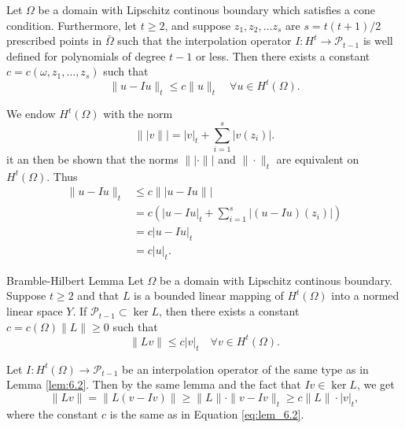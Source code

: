 
\begin{lem}{\quad}
Let $\Omega$ be a domain with Lipschitz continous boundary which satisfies a cone condition. Furthermore, let $t\geq 2$, and suppose $z_1,z_2,\ldots z_s$ are
$s = t(t+1)/2$ prescribed points in $\bar{\Omega}$ such that the interpolation operator $I:H^t \rightarrow \mathcal{P}_{t-1}$ is well defined
for polynomials of degree $t-1$ or less. Then there exists a constant $c=c(\omega,z_1,\ldots,z_s)$ such that
\begin{equation}
    \|u-Iu\|_t\leq c\|u\|_t\quad \forall u\in H^t(\Omega).
    \label{eq:lem_6.2}
\end{equation}
\label{lem:6.2}
\end{lem}

\begin{bev}
    We endow $H^t(\Omega)$ with the norm 
    \begin{equation*}
        \||v\|| = |v|_t + \sum_{i=1}^s |v(z_i)|.
    \end{equation*}
it an then be shown that the norms $\||\cdot\||$ and $\|\cdot\|_t$ are equivalent on $H^t(\Omega)$. Thus
\begin{align*}
    \|u-Iu\|_t&\leq c\||u-Iu\||\\
    &= c(|u-Iu|_t + \sum_{i=1}^s|(u-Iu)(z_i)|)\\
    &= c|u-Iu|_t \\
    &= c|u|_t.
\end{align*}

\end{bev}

\begin{lem}{Bramble-Hilbert Lemma}
    Let $\Omega$ be a domain with Lipschitz continous boundary. Suppose $t\geq 2$ and that $L$ is a bounded linear mapping of $H^t(\Omega)$ into a normed linear space $Y$.
    If $\mathcal{P}_{t-1}\subset \ker L$, then there exists a constant $c=c(\Omega)\|L\|\geq 0$ such that
    \begin{equation}
        \|Lv\|\leq c|v|_t\quad \forall v\in H^t(\Omega).
    \end{equation}
\end{lem}
\begin{bev}
    Let $I:H^t(\Omega)\rightarrow \mathcal{P}_{t-1}$ be an interpolation operator of the same type as in Lemma \ref{lem:6.2}. Then by the same lemma and the fact that $Iv\in\ker L$, we get
    \begin{equation}
        \|Lv\|=\|L(v-Iv)\|\geq \|L\|\cdot\|v-Iv\|_t\geq c\|L\| \cdot |v|_t,
    \end{equation}
    where the constant $c$  is the same as in Equation \ref{eq:lem_6.2}.
    \label{lem:6.3}
\end{bev}